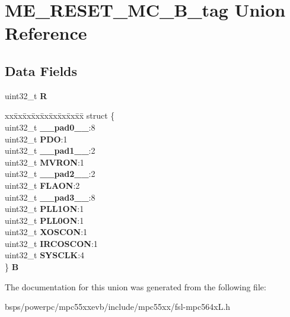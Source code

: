\hypertarget{unionME__RESET__MC__32B__tag}{}\section{M\+E\+\_\+\+R\+E\+S\+E\+T\+\_\+\+M\+C\+\_\+B\+\_\+tag Union Reference}
\label{unionME__RESET__MC__32B__tag}
\subsection*{Data Fields}
\begin{DoxyCompactItemize}
\item 
\mbox{\label{unionME__RESET__MC__32B__tag_a3fecdf4d35eed3b685591cec71bb5871}} 
uint32\+\_\+t {\bfseries R}
\item 
\mbox{\label{unionME__RESET__MC__32B__tag_ae2cc146c8bb03d319455bbcc89d2f04d}} 
\begin{tabbing}
xx\=xx\=xx\=xx\=xx\=xx\=xx\=xx\=xx\=\kill
struct \{\\
\>uint32\_t {\bfseries \_\_pad0\_\_}:8\\
\>uint32\_t {\bfseries PDO}:1\\
\>uint32\_t {\bfseries \_\_pad1\_\_}:2\\
\>uint32\_t {\bfseries MVRON}:1\\
\>uint32\_t {\bfseries \_\_pad2\_\_}:2\\
\>uint32\_t {\bfseries FLAON}:2\\
\>uint32\_t {\bfseries \_\_pad3\_\_}:8\\
\>uint32\_t {\bfseries PLL1ON}:1\\
\>uint32\_t {\bfseries PLL0ON}:1\\
\>uint32\_t {\bfseries XOSCON}:1\\
\>uint32\_t {\bfseries IRCOSCON}:1\\
\>uint32\_t {\bfseries SYSCLK}:4\\
\} {\bfseries B}\\

\end{tabbing}\end{DoxyCompactItemize}


The documentation for this union was generated from the following file\+:\begin{DoxyCompactItemize}
\item 
bsps/powerpc/mpc55xxevb/include/mpc55xx/fsl-\/mpc564x\+L.\+h\end{DoxyCompactItemize}
